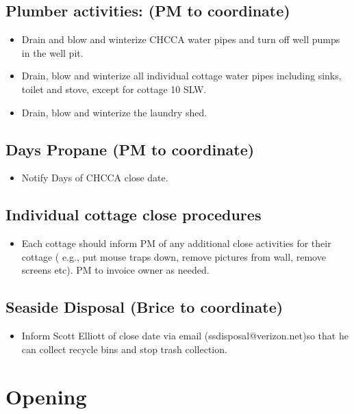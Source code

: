 \documentclass[11pt]{exam}
\begin{document}
\subsection*{Plumber activities: (PM to coordinate)}
\begin{itemize}
\item Drain and blow and winterize CHCCA water pipes and turn off well pumps in the well pit.
\item Drain, blow and winterize all individual cottage water pipes including sinks, toilet and stove, except for cottage 10 SLW.
\item Drain, blow and winterize the laundry shed.
 \end{itemize}  

\subsection*{Days Propane (PM to coordinate)}
\begin{itemize}
\item Notify Days of CHCCA close date.
 \end{itemize}  
 
\subsection*{Individual cottage close procedures}
\begin{itemize}
\item Each cottage should inform PM of any additional close activities for their cottage ( e.g., put mouse traps down, remove pictures from wall, remove screens etc). PM to invoice owner as needed.
  \end{itemize}  
  
\subsection*{Seaside Disposal (Brice to coordinate)}
\begin{itemize}
\item Inform Scott Elliott of close date via email (ssdisposal@verizon.net)so that he can collect recycle bins and stop trash collection.

   \end{itemize}  
 
\section*{Opening}
 
\end{document}
